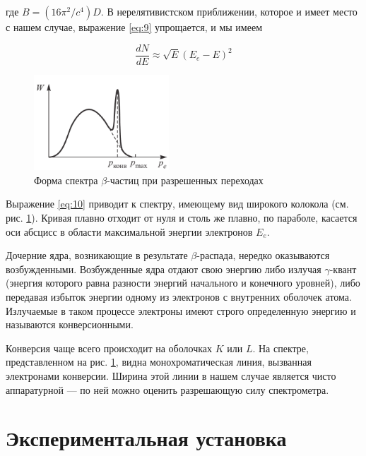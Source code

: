 \documentclass[a4paper,12pt]{article}
\begin{document}
где $B = (16 \pi^2/c^4)D$. В нерелятивистском приближении, которое и имеет место с нашем случае, выражение \eqref{eq:9} упрощается, и мы имеем

\begin{equation} \label{eq:10}
    \frac{dN}{dE} \approx \sqrt{E} \left( E_e - E \right)^2
\end{equation}

\FloatBarrier
\begin{figure}[h]
    \begin{center}
        \includegraphics[width = 0.45\textwidth]{pics/beta_specter.png}
        \caption{Форма спектра $\beta$-частиц при разрешенных переходах}
    \label{pic:beta_specter}
    \end{center}
\end{figure}
\FloatBarrier

Выражение \eqref{eq:10} приводит к спектру, имеющему вид широкого колокола (см. рис. \ref{pic:beta_specter}). Кривая плавно отходит от нуля и столь же плавно, по параболе, касается оси абсцисс в области максимальной энергии электронов $E_e$.

Дочерние ядра, возникающие в результате $\beta$-распада, нередко оказываются возбужденными. Возбужденные ядра отдают свою энергию либо излучая $\gamma$-квант (энергия которого равна разности энергий начального и конечного уровней), либо передавая избыток энергии одному из электронов с внутренних оболочек атома. Излучаемые в таком процессе электроны имеют строго определенную энергию и называются конверсионными.

Конверсия чаще всего происходит на оболочках $K$ или $L$. На спектре, представленном на рис. \ref{pic:beta_specter}, видна монохроматическая линия, вызванная электронами конверсии. Ширина этой линии в нашем случае является чисто аппаратурной — по ней можно оценить разрешающую силу спектрометра.

\section{Экспериментальная установка}
\end{document}
